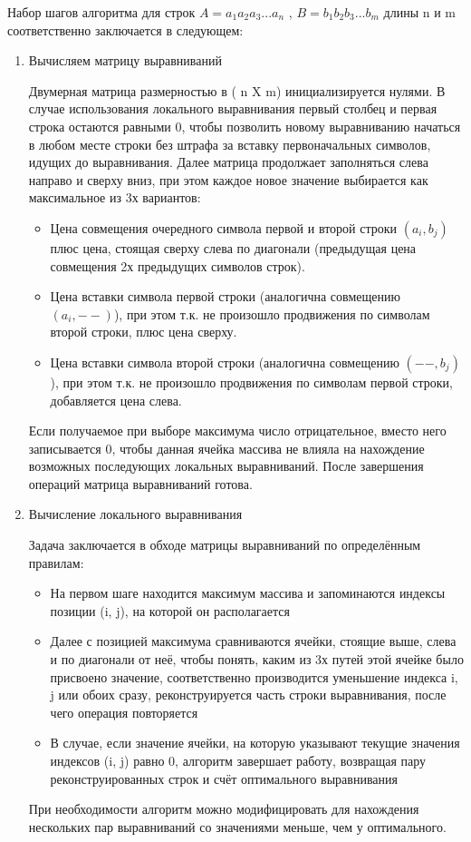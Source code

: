 Набор шагов алгоритма для строк $A = a_1 a_2 a_3 ... a_n$ , $B = b_1 b_2 b_3 ... b_m$ длины n и m соответственно заключается в следующем:
\begin {enumerate}
	\item Вычисляем матрицу выравниваний
	
	Двумерная матрица размерностью в ( n X m) инициализируется нулями. В случае использования локального выравнивания первый столбец и первая строка остаются равными 0, чтобы позволить новому выравниванию начаться в любом месте строки без штрафа за вставку первоначальных символов, идущих до выравнивания. Далее матрица продолжает заполняться слева направо и сверху вниз, при этом каждое новое значение выбирается как максимальное из 3х вариантов:
	\begin {itemize}
		\item Цена совмещения очередного символа первой и второй строки $(a_i, b_j)$ плюс цена, стоящая сверху слева по диагонали (предыдущая цена совмещения 2х предыдущих символов строк).
		\item Цена вставки символа первой строки (аналогична совмещению $(a_i, --)$), при этом т.к. не произошло продвижения по символам второй строки, плюс цена сверху.
		\item Цена вставки символа второй строки (аналогична совмещению $(--, b_j)$), при этом т.к. не произошло продвижения по символам первой строки, добавляется цена слева.
	\end {itemize}
	Если получаемое при выборе максимума число отрицательное, вместо него записывается 0, чтобы данная ячейка массива не влияла на нахождение возможных последующих локальных выравниваний.
	После завершения операций матрица выравниваний готова.
	\item Вычисление локального выравнивания

	Задача заключается в обходе матрицы выравниваний по определённым правилам:
	\begin {itemize}
		\item На первом шаге находится максимум массива и запоминаются индексы позиции (i, j), на которой он располагается
		\item Далее с позицией максимума сравниваются ячейки, стоящие выше, слева и по диагонали от неё, чтобы понять, каким из 3х путей этой ячейке было присвоено значение, соответственно производится уменьшение индекса i, j или обоих сразу, реконструируется часть строки выравнивания, после чего операция повторяется
		\item В случае, если значение ячейки, на которую указывают текущие значения индексов (i, j) равно 0, алгоритм завершает работу, возвращая пару реконструированных строк и счёт оптимального выравнивания
	\end {itemize}
	При необходимости алгоритм можно модифицировать для нахождения нескольких пар выравниваний со значениями меньше, чем у оптимального.
\end {enumerate}
